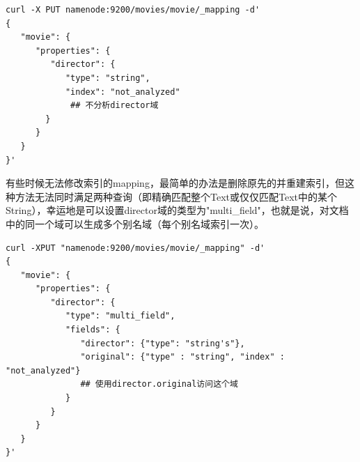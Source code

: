 \begin{verbatim}
curl -X PUT namenode:9200/movies/movie/_mapping -d'
{
   "movie": {
      "properties": {
         "director": {
            "type": "string",
            "index": "not_analyzed"
             ## 不分析director域
        }
      }
   }
}'
\end{verbatim}
\par 有些时候无法修改索引的mapping，最简单的办法是删除原先的并重建索引，但这种方法无法同时满足两种查询（即精确匹配整个Text或仅仅匹配Text中的某个String），幸运地是可以设置director域的类型为"multi\_field"，也就是说，对文档中的同一个域可以生成多个别名域（每个别名域索引一次）。
\begin{verbatim}
curl -XPUT "namenode:9200/movies/movie/_mapping" -d'
{
   "movie": {
      "properties": {
         "director": {
            "type": "multi_field",
            "fields": {
               "director": {"type": "string's"},
               "original": {"type" : "string", "index" : "not_analyzed"}
               ## 使用director.original访问这个域
            }
         }
      }
   }
}'
\end{verbatim}

